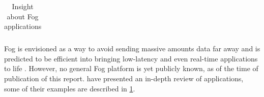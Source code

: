 \documentclass[11pt]{sdm}
\begin{document}
\begin{table}[t]
\begin{tabular}{@{} p{3cm}|p{12cm} @{}}
		\cmidrule[1pt]{1-2}
	\end{tabular}
	\caption{\label{tab:applications}Insight about Fog applications \cite{ahmed_fog_2019}}
\end{table}

Fog is envisioned as a way to avoid sending massive amounts data far away and is predicted to be efficient into bringing low-latency and even real-time applications to life \cite{ahmed_fog_2019}. However, no general Fog platform is yet publicly known, as of the time of publication of this report. \citet{ahmed_fog_2019} have presented an in-depth review of applications, some of their examples are described in \ref{tab:applications}.
\end{document}

